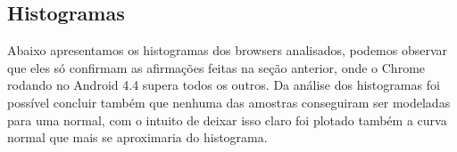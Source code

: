 \documentclass[11pt,a4paper]{article}
\begin{document}
\begin{figure}
\begin{subfigure}{.5\textwidth}
        \label{nexus44200}
    \end{subfigure}
\end{figure}


\subsection{Histogramas}\label{histogramas}

Abaixo apresentamos os histogramas dos browsers analisados, podemos observar que eles só confirmam as afirmações feitas
na seção anterior, onde o Chrome rodando no Android 4.4 supera todos os outros. Da análise dos histogramas foi possível
concluir também que nenhuma das amostras conseguiram ser modeladas para uma normal, com o intuito de deixar isso claro
foi plotado também a curva normal que mais se aproximaria do histograma.
\end{document}
